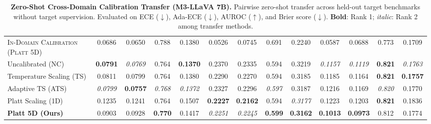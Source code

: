 \begin{table}[t]
{\begin{tabular}{l cccc cccc cccc}
\midrule
\textsc{In-Domain Calibration (Platt 5D)} & 0.0686 & 0.0650 & 0.788 & 0.1380 & 0.0526 & 0.0745 & 0.691 & 0.2240 & 0.0587 & 0.0688 & 0.773 & 0.1709 \\
Uncalibrated (NC) & \textbf{0.0791} & \textit{0.0769} & 0.764 & \textbf{0.1370} & 0.2370 & 0.2335 & 0.594 & 0.3219 & \textit{0.1157} & \textit{0.1119} & \textbf{0.821} & \textit{0.1763} \\
Temperature Scaling (TS) & 0.0811 & 0.0799 & 0.764 & 0.1380 & 0.2290 & 0.2270 & 0.594 & 0.3185 & 0.1185 & 0.1164 & \textbf{0.821} & \textbf{0.1757} \\
Adaptive TS (ATS) & \textit{0.0799} & \textbf{0.0757} & \textit{0.768} & \textit{0.1372} & 0.2327 & 0.2296 & \textit{0.597} & 0.3187 & 0.1216 & 0.1169 & \textit{0.820} & 0.1770 \\
Platt Scaling (1D) & 0.1235 & 0.1241 & 0.764 & 0.1507 & \textbf{0.2227} & \textbf{0.2162} & 0.594 & \textit{0.3177} & 0.1223 & 0.1203 & \textbf{0.821} & 0.1836 \\
\textbf{Platt 5D (Ours)} & 0.0903 & 0.0928 & \textbf{0.770} & 0.1417 & \textit{0.2251} & \textit{0.2245} & \textbf{0.599} & \textbf{0.3162} & \textbf{0.1013} & \textbf{0.0973} & 0.812 & 0.1774 \\
\bottomrule
\end{tabular}%
}
\caption{\textbf{Zero-Shot Cross-Domain Calibration Transfer (M3-LLaVA 7B).} Pairwise zero-shot transfer across held-out target benchmarks without target supervision. Evaluated on ECE ($\downarrow$), Ada-ECE ($\downarrow$), AUROC ($\uparrow$), and Brier score ($\downarrow$). \textbf{Bold}: Rank 1; \textit{italic}: Rank 2 among transfer methods.}
\label{tab:table2_m3_transfer}
\end{table}
